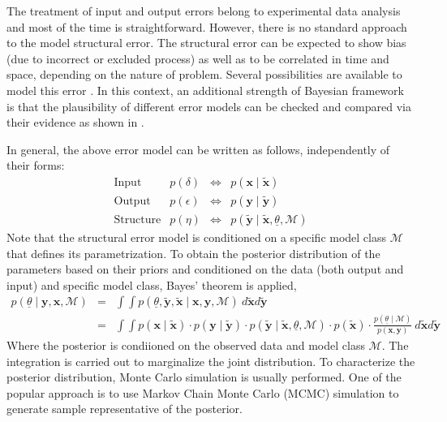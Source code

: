 \documentclass[11pt,titlepage]{article}
\begin{document}
The treatment of input and output errors belong to experimental data analysis and most of the time is straightforward. 
However, there is no standard approach to the model structural error. 
The structural error can be expected to show bias (due to incorrect or excluded process) as well as to be correlated in time and space, depending on the nature of problem. 
Several possibilities are available to model this error \cite{Simoen2013, Schoups2010}. 
In this context, an additional strength of Bayesian framework is that the plausibility of different error models can be checked and compared via their evidence as shown in \cite{Beck2010}.

In general, the above error model can be written as follows, independently of their forms:
\begin{equation}
\begin{array}{lrcr} 
	\text{Input} 	& p(\delta)	 	& \iff & p(\mathbf{x} \mid \mathbf{\tilde{x}}) \\ 
	\text{Output} 	& p(\epsilon) 	& \iff & p(\mathbf{y} \mid \mathbf{\tilde{y}}) \\
	\text{Structure}	& p(\eta) 		& \iff & p(\mathbf{\tilde{y}} \mid \mathbf{\tilde{x}}, \underline{\theta}, \mathcal{M}) 
\end{array}
\nonumber
\end{equation}
Note that the structural error model is conditioned on a specific model class $\mathcal{M}$ that defines its parametrization. 
To obtain the posterior distribution of the parameters based on their priors and conditioned on the data (both output and input) and specific model class, Bayes' theorem is applied,
\begin{equation}
\begin{array}{rcl} 
	p(\underline{\theta} \mid \mathbf{y}, \mathbf{x}, \mathcal{M} )	& = & \int \int p(\underline{\theta}, \mathbf{\tilde{y}}, \mathbf{\tilde{x}} \mid \mathbf{x}, \mathbf{y}, \mathcal{M} ) \: d\mathbf{\tilde{x}} d\mathbf{\tilde{y}} \\ 
		& = & \int \int p(\mathbf{x} \mid \mathbf{\tilde{x}}) \cdot p(\mathbf{y} \mid \mathbf{\tilde{y}}) \cdot p(\mathbf{\tilde{y}} \mid \mathbf{\tilde{x}}, \underline{\theta}, \mathcal{M} ) \cdot p(\mathbf{\tilde{x}}) \cdot \frac{p(\underline{\theta} \mid \mathcal{M})}{p(\mathbf{x}, \mathbf{y})} \: d\mathbf{\tilde{x}} d\mathbf{\tilde{y}}
\end{array}
\nonumber
\end{equation}
Where the posterior is condiioned on the observed data and model class $\mathcal{M}$. 
The integration is carried out to marginalize the joint distribution. 
To characterize the posterior distribution, Monte Carlo simulation is usually performed. 
One of the popular approach is to use Markov Chain Monte Carlo (MCMC) simulation to generate sample representative of the posterior.
\end{document}

